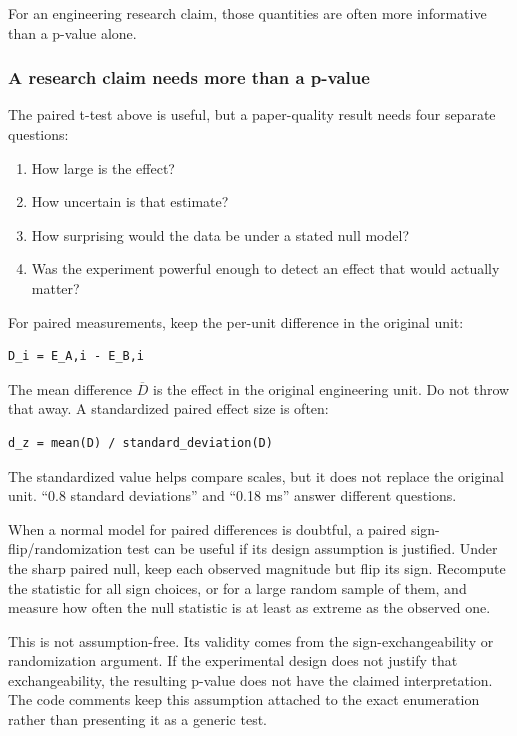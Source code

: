 For an engineering research claim, those quantities are often more informative than a p-value alone.

\subsubsection{A research claim needs more than a p-value}\label{02-foundations-ii-ch030-a-research-claim-needs-more-than-a-p-value}

The paired t-test above is useful, but a paper-quality result needs four separate questions:

\begin{enumerate}
\def\labelenumi{\arabic{enumi}.}
\tightlist
\item
  How large is the effect?
\item
  How uncertain is that estimate?
\item
  How surprising would the data be under a stated null model?
\item
  Was the experiment powerful enough to detect an effect that would actually matter?
\end{enumerate}

For paired measurements, keep the per-unit difference in the original unit:

\begin{verbatim}
D_i = E_A,i - E_B,i
\end{verbatim}

The mean difference \(\overline{D}\) is the effect in the original engineering unit. Do not throw that away. A standardized paired effect size is often:

\begin{verbatim}
d_z = mean(D) / standard_deviation(D)
\end{verbatim}

The standardized value helps compare scales, but it does not replace the original unit. ``0.8 standard deviations'' and ``0.18 ms'' answer different questions.

When a normal model for paired differences is doubtful, a paired sign-flip/randomization test can be useful if its design assumption is justified. Under the sharp paired null, keep each observed magnitude but flip its sign. Recompute the statistic for all sign choices, or for a large random sample of them, and measure how often the null statistic is at least as extreme as the observed one.

This is not assumption-free. Its validity comes from the sign-exchangeability or randomization argument. If the experimental design does not justify that exchangeability, the resulting p-value does not have the claimed interpretation. The code comments keep this assumption attached to the exact enumeration rather than presenting it as a generic test.

